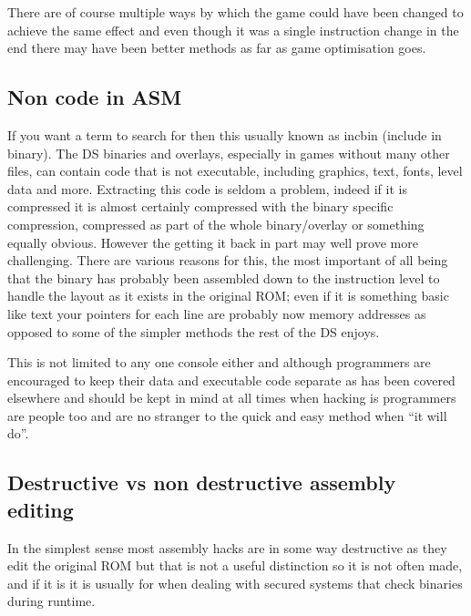 \documentclass[
]{book}
\begin{document}
There are of course multiple ways by which the game could have been changed to achieve the same effect and even though it was a single instruction change in the end there may have been better methods as far as game optimisation goes.

\hypertarget{non-code-in-asm}{%
\subsection{Non code in ASM}\label{non-code-in-asm}}

If you want a term to search for then this usually known as incbin (include in binary). The DS binaries and overlays, especially in games without many other files, can contain code that is not executable, including graphics, text, fonts, level data and more. Extracting this code is seldom a problem, indeed if it is compressed it is almost certainly compressed with the binary specific compression, compressed as part of the whole binary/overlay or something equally obvious. However the getting it back in part may well prove more challenging. There are various reasons for this, the most important of all being that the binary has probably been assembled down to the instruction level to handle the layout as it exists in the original ROM; even if it is something basic like text your pointers for each line are probably now memory addresses as opposed to some of the simpler methods the rest of the DS enjoys.

This is not limited to any one console either and although programmers are encouraged to keep their data and executable code separate as has been covered elsewhere and should be kept in mind at all times when hacking is programmers are people too and are no stranger to the quick and easy method when ``it will do''.

\hypertarget{destructive-vs-non-destructive-assembly-editing}{%
\subsection{Destructive vs non destructive assembly editing}\label{destructive-vs-non-destructive-assembly-editing}}

In the simplest sense most assembly hacks are in some way destructive as they edit the original ROM but that is not a useful distinction so it is not often made, and if it is it is usually for when dealing with secured systems that check binaries during runtime.
\end{document}
